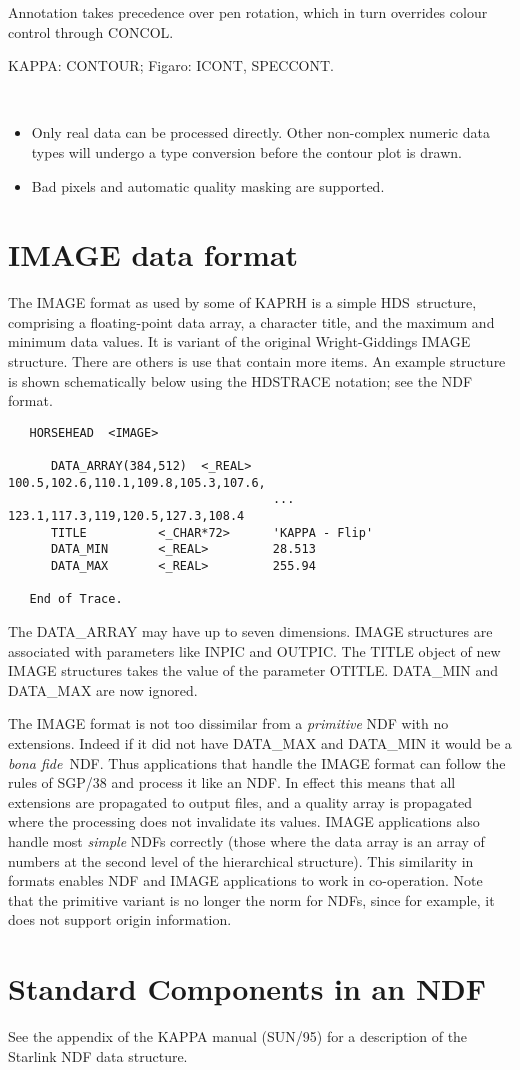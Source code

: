 \documentclass[twoside,11pt]{article}
\newcommand{\htmlref}[2]{#1}
\newcommand{\xref}[3]{#1}
\newcommand{\xlabel}[1]{}
\newcommand{\latexelsehtml}[2]{#1}
\renewcommand{\latexelsehtml}[2]{#2}
\newcommand{\HDSref}{\xref{HDS}{sun92}{}}
\newcommand{\HDSTRACEref}{\xref{{\footnotesize HDSTRACE}}{sun102}{}}
\newcommand{\sstdiytopic}[2]{\goodbreak \item[{\hspace{-0.35em}#1\hspace{-0.35em}:}] \mbox{} \\[1.3ex] #2}
\newcommand{\sstimplementationstatus}[1]{
   \pagebreak[3] \item[{Implementation Status:}] \mbox{} \\[1.3ex] #1}
\newenvironment{sstitemize}{%
  \vspace{-4.3ex}\begin{itemize}}{\end{itemize}}
\newcommand{\sstitemlist}[1]{
  \mbox{} \\
  \vspace{-3.5ex}
  \begin{sstitemize}
     #1
  \end{sstitemize}
}
\newcommand{\sstitem}{\item}
\renewcommand{\sstdiytopic}[2]{\item[{#1}]
      \begin{description}
         #2
      \end{description}
   }
\renewcommand{\sstimplementationstatus}[1]{\item[Implementation Status:] 
      \begin{description}
         #1
      \end{description}
   }
\newcommand{\sstitemlist}[1]{
      \begin{itemize}
         #1
      \end{itemize}
   }
\begin{document}
{{{         Annotation takes precedence over pen rotation, which in turn
         overrides colour control through CONCOL. 
      }
   }
   \sstdiytopic{
      Related Applications
   }{
      KAPPA: CONTOUR; Figaro: ICONT, SPECCONT.
   }
   \sstimplementationstatus{
      \sstitemlist{

         \sstitem
         Only real data can be processed directly.  Other non-complex
         numeric data types will undergo a type conversion before the
         contour plot is drawn.

         \sstitem
         Bad pixels and automatic quality masking are supported.
      }
   }
}

\newpage
\section{\xlabel{ap_IMAGEformat}IMAGE data format\label{ap:IMAGEformat}}

The IMAGE format as used by some of {\footnotesize KAPRH} is a simple
\HDSref\ structure, comprising a floating-point data array, a character title,
and the maximum and minimum data values.  It is variant of the
original Wright-Giddings IMAGE structure.  There are others is use
that contain more items. An example structure is shown schematically
below using the \HDSTRACEref{} notation; see
\latexelsehtml{Appendix~\ref{ap:NDFformat}}{\htmlref{the NDF format}{ap:NDFformat}}.
\begin{verbatim}
   HORSEHEAD  <IMAGE>

      DATA_ARRAY(384,512)  <_REAL>   100.5,102.6,110.1,109.8,105.3,107.6,
                                     ... 123.1,117.3,119,120.5,127.3,108.4
      TITLE          <_CHAR*72>      'KAPPA - Flip'
      DATA_MIN       <_REAL>         28.513
      DATA_MAX       <_REAL>         255.94

   End of Trace.
\end{verbatim}

The DATA\_ARRAY may have up to seven dimensions.
IMAGE structures are associated with parameters like INPIC and OUTPIC.
The TITLE object of new IMAGE structures takes the value of the
parameter OTITLE.  DATA\_MIN and DATA\_MAX are now ignored.

The IMAGE format is not too dissimilar from a {\em primitive\/} NDF
with no extensions.  Indeed if it did not have DATA\_MAX and DATA\_MIN
it would be a {\it bona fide}\ NDF.  Thus applications that handle the
IMAGE format can follow the rules of \xref{SGP/38}{sgp38}{} and
process it like an NDF.  In effect this means that all extensions are
propagated to output files, and a quality array is propagated where
the processing does not invalidate its values.  IMAGE applications
also handle most {\em simple\/} NDFs correctly (those where the data
array is an array of numbers at the second level of the hierarchical
structure).  This similarity in formats enables NDF and IMAGE
applications to work in co-operation. Note that the primitive
variant is no longer the norm for NDFs, since for example, it does not
support origin information.

\section{Standard Components in an NDF\label{ap:NDFformat}}
See the \xref{appendix}{sun95}{ap_NDFformat} of the KAPPA manual (SUN/95)
for a description of the Starlink NDF data structure.
\end{document}
